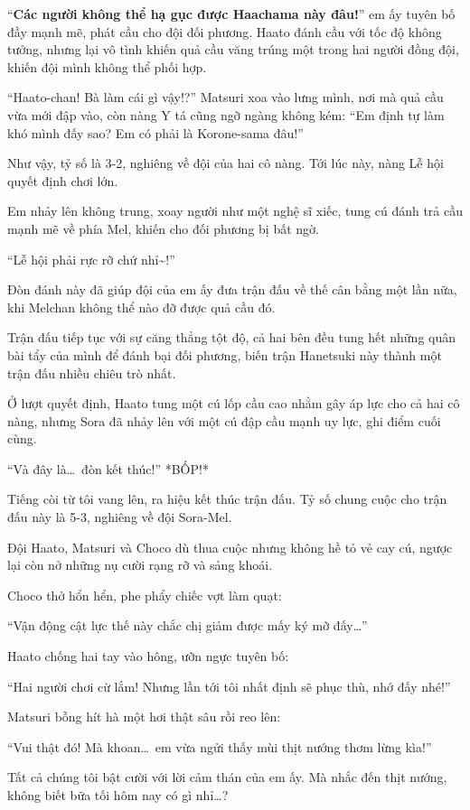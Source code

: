 \documentclass[../main.tex]{subfiles}
\begin{document}
``\textbf{Các người không thể hạ gục được Haachama này đâu!}'' em ấy tuyên bố đầy mạnh mẽ, phát cầu cho đội đối phương. Haato đánh cầu với tốc độ không tưởng, nhưng lại vô tình khiến quả cầu văng trúng một trong hai người đồng đội, khiến đội mình không thể phối hợp.

``Haato-chan! Bà làm cái gì vậy!?'' Matsuri xoa vào lưng mình, nơi mà quả cầu vừa mới đập vào, còn nàng Y tá cũng ngỡ ngàng không kém: ``Em định tự làm khó mình đấy sao? Em có phải là Korone-sama đâu!''

Như vậy, tỷ số là 3-2, nghiêng về đội của hai cô nàng. Tới lúc này, nàng Lễ hội quyết định chơi lớn.

Em nhảy lên không trung, xoay người như một nghệ sĩ xiếc, tung cú đánh trả cầu mạnh mẽ về phía Mel, khiến cho đối phương bị bất ngờ.

``Lễ hội phải rực rỡ chứ nhỉ\~{}!''

Đòn đánh này đã giúp đội của em ấy đưa trận đấu về thế cân bằng một lần nữa, khi Melchan không thể nào đỡ được quả cầu đó.

Trận đấu tiếp tục với sự căng thẳng tột độ, cả hai bên đều tung hết những quân bài tẩy của mình để đánh bại đối phương, biến trận Hanetsuki này thành một trận đấu nhiều chiêu trò nhất.

Ở lượt quyết định, Haato tung một cú lốp cầu cao nhằm gây áp lực cho cả hai cô nàng, nhưng Sora đã nhảy lên với một cú đập cầu mạnh uy lực, ghi điểm cuối cùng.

``Và đây là\dots\ đòn kết thúc!'' *BỐP!*

Tiếng còi từ tôi vang lên, ra hiệu kết thúc trận đấu. Tỷ số chung cuộc cho trận đấu này là 5-3, nghiêng về đội Sora-Mel.

Đội Haato, Matsuri và Choco dù thua cuộc nhưng không hề tỏ vẻ cay cú, ngược lại còn nở những nụ cười rạng rỡ và sảng khoái.

Choco thở hổn hển, phe phẩy chiếc vợt làm quạt:

``Vận động cật lực thế này chắc chị giảm được mấy ký mỡ đấy\dots''

Haato chống hai tay vào hông, ưỡn ngực tuyên bố:

``Hai người chơi cừ lắm! Nhưng lần tới tôi nhất định sẽ phục thù, nhớ đấy nhé!''

Matsuri bỗng hít hà một hơi thật sâu rồi reo lên:

``Vui thật đó! Mà khoan\dots\ em vừa ngửi thấy mùi thịt nướng thơm lừng kìa!''

Tất cả chúng tôi bật cười với lời cảm thán của em ấy. Mà nhắc đến thịt nướng, không biết bữa tối hôm nay có gì nhỉ\dots?
\end{document}
